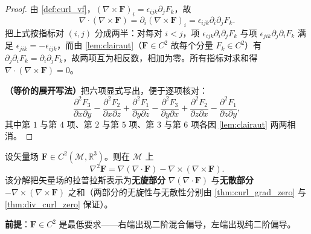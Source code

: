 \begin{proof}
由 \cref{def:curl_vf}，$(\nabla\times\mathbf F)_i = \epsilon_{ijk}\partial_jF_k$，故
\[
\nabla\cdot(\nabla\times\mathbf F) = \partial_i(\nabla\times\mathbf F)_i = \epsilon_{ijk}\partial_i\partial_jF_k .
\]
把上式按指标对 $(i,j)$ 分成两半：对每对 $i<j$，项 $\epsilon_{ijk}\partial_i\partial_jF_k$ 与项 $\epsilon_{jik}\partial_j\partial_iF_k$ 满足 $\epsilon_{jik}=-\epsilon_{ijk}$，而由 \cref{lem:clairaut}（$\mathbf F\in C^2$ 故每个分量 $F_k\in C^2$）有 $\partial_j\partial_iF_k=\partial_i\partial_jF_k$，故两项互为相反数，相加为零。所有指标对求和得 $\nabla\cdot(\nabla\times\mathbf F)=0$。

\textbf{（等价的展开写法）}把六项显式写出，便于逐项核对：
\[
\frac{\partial^2 F_3}{\partial x \partial y} - \frac{\partial^2 F_2}{\partial x \partial z} + \frac{\partial^2 F_1}{\partial y \partial z} - \frac{\partial^2 F_3}{\partial y \partial x} + \frac{\partial^2 F_2}{\partial z \partial x} - \frac{\partial^2 F_1}{\partial z \partial y},
\]
其中第 $1$ 与第 $4$ 项、第 $2$ 与第 $5$ 项、第 $3$ 与第 $6$ 项各因 \cref{lem:clairaut} 两两相消。
\end{proof}

\begin{theorem}\label{thm:laplacian_decomp}
设矢量场 $\mathbf{F} \in C^2(\mathcal{M}, \mathbb{R}^3)$。则在 $\mathcal M$ 上
\[
\nabla^2 \mathbf{F} = \nabla(\nabla \cdot \mathbf{F}) - \nabla \times (\nabla \times \mathbf{F}).
\]
该分解把矢量场的拉普拉斯表示为\textbf{无旋部分} $\nabla(\nabla\cdot\mathbf F)$ 与\textbf{无散部分} $-\nabla\times(\nabla\times\mathbf F)$ 之和（两部分的无旋性与无散性分别由 \cref{thm:curl_grad_zero} 与 \cref{thm:div_curl_zero} 保证）。

\textbf{前提}：$\mathbf F\in C^2$ 是最低要求——右端出现二阶混合偏导，左端出现纯二阶偏导。
\end{theorem}

